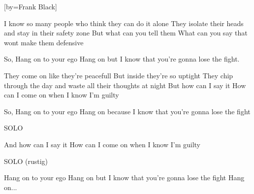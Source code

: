  

[by=Frank Black]




\beginverse
I know so many people who think they can do it alone
They isolate their heads and stay in their safety zone
But what can you tell them
What can you say that wont make them defensive
\endverse

\beginchorus
So, Hang on to your ego
Hang on but I know that you're gonna lose the fight.
\endchorus

\beginverse
They come on like they're peacefull
But inside they're so uptight
They chip through the day and waste all their thoughts at night
But how can I say it
How can I come on when I know I'm guilty
\endverse

\beginchorus
So, Hang on to your ego
Hang on because I know that you're gonna lose the fight
\endchorus

\beginchorus
SOLO
\endchorus

\beginchorus
And how can I say it
How can I come on when I know I'm guilty
\endchorus

\beginchorus
SOLO (rustig)
\endchorus

\beginverse
Hang on to your ego 
Hang on but I know that you're gonna lose the fight 
Hang on...
\endverse

\endsong
